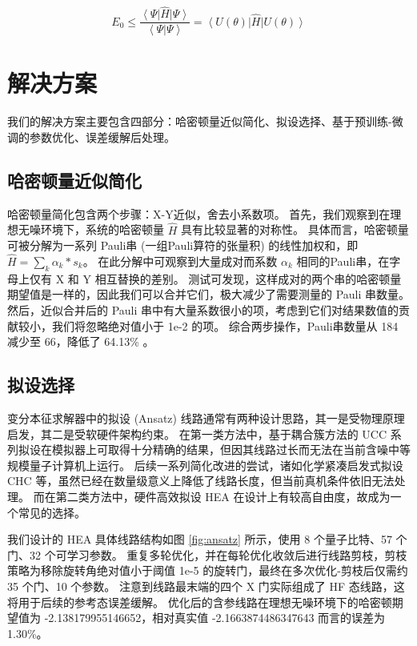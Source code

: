 \documentclass[withoutpreface,bwprint]{cumcmthesis}
\begin{document}
\begin{equation}
E_0 \le \frac{\left< \Psi  \right| \hat H \left| \Psi \right>}{\left< \Psi | \Psi \right>} = \left< U(\theta)  \right| \hat H \left| U(\theta) \right>
\label{eq:rr-method}
\end{equation}


\section{解决方案}

我们的解决方案主要包含四部分：哈密顿量近似简化、拟设选择、基于预训练-微调的参数优化、误差缓解后处理。

\subsection{哈密顿量近似简化}

哈密顿量简化包含两个步骤：X-Y近似，舍去小系数项。
首先，我们观察到在理想无噪环境下，系统的哈密顿量 $ \hat H $ 具有比较显著的对称性。
具体而言，哈密顿量可被分解为一系列 Pauli串 (一组Pauli算符的张量积) 的线性加权和，即 $ \hat H = \sum_k \alpha_k * s_k $。
在此分解中可观察到大量成对而系数 $ \alpha_k $ 相同的Pauli串，在字母上仅有 X 和 Y 相互替换的差别。
测试可发现，这样成对的两个串的哈密顿量期望值是一样的，因此我们可以合并它们，极大减少了需要测量的 Pauli 串数量。
然后，近似合并后的 Pauli 串中有大量系数很小的项，考虑到它们对结果数值的贡献较小，我们将忽略绝对值小于 1e-2 的项。
综合两步操作，Pauli串数量从 184 减少至 66，降低了 64.13\% 。

\subsection{拟设选择}

变分本征求解器中的拟设 (Ansatz) 线路通常有两种设计思路，其一是受物理原理启发，其二是受软硬件架构约束。
在第一类方法中，基于耦合簇方法的 UCC \cite{UCC2017} 系列拟设在模拟器上可取得十分精确的结果，但因其线路过长而无法在当前含噪中等规模量子计算机上运行。
后续一系列简化改进的尝试，诸如化学紧凑启发式拟设 CHC \cite{CHC2020} 等，虽然已经在数量级意义上降低了线路长度，但当前真机条件依旧无法处理。
而在第二类方法中，硬件高效拟设 HEA \cite{HEA2017} 在设计上有较高自由度，故成为一个常见的选择。

我们设计的 HEA 具体线路结构如图 \ref{fig:ansatz} 所示，使用 8 个量子比特、57 个门、32 个可学习参数。
重复多轮优化，并在每轮优化收敛后进行线路剪枝，剪枝策略为移除旋转角绝对值小于阈值 1e-5 的旋转门，最终在多次优化-剪枝后仅需约 35 个门、10 个参数。
注意到线路最末端的四个 X 门实际组成了 HF 态线路，这将用于后续的参考态误差缓解。
优化后的含参线路在理想无噪环境下的哈密顿期望值为 -2.138179955146652，相对真实值 -2.1663874486347643 而言的误差为 1.30\%。
\end{document}
